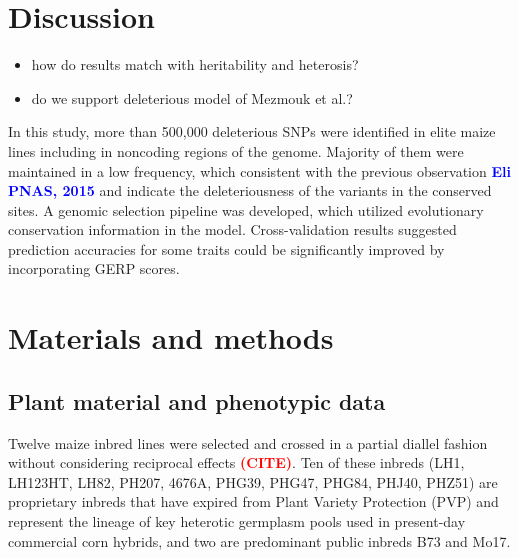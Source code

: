 \documentclass[10pt]{article}
\newcommand{\sme}[1]{\textcolor{red}{\bf #1}}
\newcommand{\yang}[1]{\textcolor{blue}{\bf #1}}
\begin{document}
\section*{Discussion}


\begin{itemize}
  \item how do results match with heritability and heterosis?
  \item do we support deleterious model of Mezmouk et al.?
\end{itemize}

In this study, more than 500,000 deleterious SNPs were identified in elite maize lines including in noncoding regions of the genome. Majority of them were maintained in a low frequency, which consistent with the previous observation \yang{Eli PNAS, 2015} and indicate the deleteriousness of the variants in the conserved sites. A genomic selection pipeline was developed, which utilized evolutionary conservation information in the model.
Cross-validation results suggested prediction accuracies for some traits could be significantly improved by incorporating GERP scores. 



\section*{Materials and methods}

\subsection*{Plant material and phenotypic data}
Twelve maize inbred lines were selected and crossed in a partial diallel fashion without considering reciprocal effects \sme{(CITE)}. Ten of these inbreds (LH1, LH123HT, LH82, PH207, 4676A, PHG39, PHG47, PHG84, PHJ40, PHZ51) are proprietary inbreds that have expired from Plant Variety Protection (PVP) and represent the lineage of key heterotic germplasm pools used in present-day commercial corn hybrids, and two are predominant public inbreds B73 and Mo17.  \\
\end{document}
